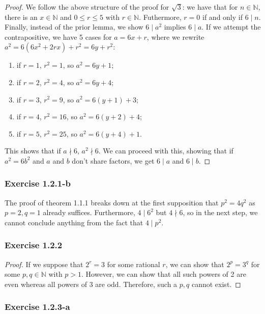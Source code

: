 \documentclass{article}
\newcommand{\N}{\mathbb{N}}
\begin{document}
\begin{proof}
We follow the above structure of the proof for $\sqrt{3}$: we have that for $n \in \N$,
there is an $x \in \N$ and $0 \leq r \leq 5$ with $r \in \N$. Futhermore, $r = 0$ if and only if $6 \mid n$.
Finally, instead of the prior lemma, we show $6 \mid a^2$ implies $6 \mid a$.
If we attempt the contrapositive, we have 5 cases for $a = 6x + r$, where we rewrite $a^2 = 6 (6x^2 + 2rx) + r^2 = 6y + r^2$:
\begin{enumerate}
    \item if $r = 1$, $r^2 = 1$, so $a^2 = 6y + 1$;
    \item if $r = 2$, $r^2 = 4$, so $a^2 = 6y + 4$;
    \item if $r = 3$, $r^2 = 9$, so $a^2 = 6(y + 1) + 3$;
    \item if $r = 4$, $r^2 = 16$, so $a^2 = 6(y + 2) + 4$;
    \item if $r = 5$, $r^2 = 25$, so $a^2 = 6(y + 4) + 1$.
\end{enumerate}
This shows that if $a \nmid 6$, $a^2 \nmid 6$. We can proceed with this, showing that if $a^2 = 6b^2$ and
$a$ and $b$ don't share factors, we get $6 \mid a$ and $6 \mid b$.
\end{proof}

\subsubsection*{Exercise 1.2.1-b}

The proof of theorem 1.1.1 breaks down at the first supposition that $p^2 = 4q^2$ as $p = 2, q = 1$ already suffices.
Furthermore, $4 \mid 6^2$ but $4 \nmid 6$, so in the next step, we cannot conclude anything from the fact that $4 \mid p^2$.

\subsubsection*{Exercise 1.2.2}

\begin{proof}
If we suppose that $2^r = 3$ for some rational $r$, we can show that $2^p = 3^q$ for some $p, q \in \N$ with $p > 1$.
However, we can show that all such powers of 2 are even whereas all powers of 3 are odd. Therefore, such a $p, q$
cannot exist.
\end{proof}

\subsubsection*{Exercise 1.2.3-a}
\end{document}
